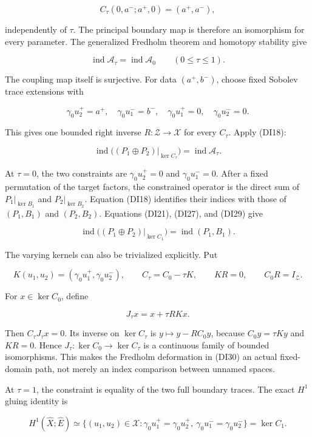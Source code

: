 \documentclass[
  11pt,
]{article}
\begin{document}
\[
 C_\tau(0,a^-;a^+,0)=(a^+,a^-),
 \tag{DI26}
\]

independently of \(\tau\). The principal boundary map is therefore an
isomorphism for every parameter. The generalized Fredholm theorem and
homotopy stability give

\[
 \operatorname{ind}\mathcal A_\tau
       =\operatorname{ind}\mathcal A_0
       \qquad(0\leq\tau\leq1).
 \tag{DI27}
\]

The coupling map itself is surjective. For data \((a^+,b^-)\), choose
fixed Sobolev trace extensions with

\[
 \gamma_0u_2^+=a^+,\quad \gamma_0u_1^-=b^-,\quad
 \gamma_0u_1^+=0,\quad \gamma_0u_2^-=0.
 \tag{DI28}
\]

This gives one bounded right inverse \(R:\mathcal Z\to\mathcal X\) for
every \(C_\tau\). Apply (DI18):

\[
 \operatorname{ind}\bigl((P_1\oplus P_2)|_{\ker C_\tau}\bigr)
       =\operatorname{ind}\mathcal A_\tau.
 \tag{DI29}
\]

At \(\tau=0\), the two constraints are \(\gamma_0u_2^+=0\) and
\(\gamma_0u_1^-=0\). After a fixed permutation of the target factors,
the constrained operator is the direct sum of \(P_1|_{\ker B_1}\) and
\(P_2|_{\ker B_2}\). Equation (DI18) identifies their indices with those
of \((P_1,B_1)\) and \((P_2,B_2)\). Equations (DI21), (DI27), and (DI29)
give

\[
 \operatorname{ind}\bigl((P_1\oplus P_2)|_{\ker C_1}\bigr)
 =\operatorname{ind}(P_1,B_1).
 \tag{DI30}
\]

The varying kernels can also be trivialized explicitly. Put

\[
 K(u_1,u_2)=(\gamma_0u_1^+,\gamma_0u_2^-),\qquad
 C_\tau=C_0-\tau K,\qquad KR=0,\qquad C_0R=I_{\mathcal Z}.
 \tag{DI31}
\]

For \(x\in\ker C_0\), define

\[
 J_\tau x=x+\tau RKx.
 \tag{DI32}
\]

Then \(C_\tau J_\tau x=0\). Its inverse on \(\ker C_\tau\) is
\(y\mapsto y-RC_0y\), because \(C_0y=\tau Ky\) and \(KR=0\). Hence
\(J_\tau:\ker C_0\to\ker C_\tau\) is a continuous family of bounded
isomorphisms. This makes the Fredholm deformation in (DI30) an actual
fixed-domain path, not merely an index comparison between unnamed
spaces.

At \(\tau=1\), the constraint is equality of the two full boundary
traces. The exact \(H^1\) gluing identity is

\[
 H^1(\widehat X;\widehat E)
 \simeq\{(u_1,u_2)\in\mathcal X:
        \gamma_0u_1^+=\gamma_0u_2^+,
        \ \gamma_0u_1^-=\gamma_0u_2^-\}
 =\ker C_1.
 \tag{DI33}
\]
\end{document}
